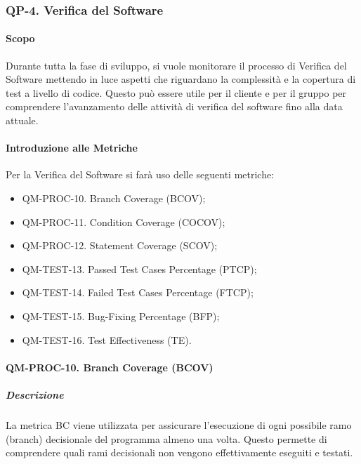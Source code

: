 		\subsubsection{QP-4. Verifica del Software}

			\paragraph{Scopo}

				Durante tutta la fase di sviluppo, si vuole monitorare il processo di Verifica del Software mettendo in luce aspetti che riguardano la complessità e la copertura di test a livello di codice. Questo può essere utile per il cliente e per il gruppo per comprendere l'avanzamento delle attività di verifica del software fino alla data attuale.

			\paragraph{Introduzione alle Metriche}

				Per la Verifica del Software si farà uso delle seguenti metriche:

				\begin{itemize}

					\item QM-PROC-10. Branch Coverage (BCOV);
					\item QM-PROC-11. Condition Coverage (COCOV);
					\item QM-PROC-12. Statement Coverage (SCOV);
					\item QM-TEST-13. Passed Test Cases Percentage (PTCP);
					\item QM-TEST-14. Failed Test Cases Percentage (FTCP);
					\item QM-TEST-15. Bug-Fixing Percentage (BFP);
					\item QM-TEST-16. Test Effectiveness (TE).
				\end{itemize}

			\paragraph{QM-PROC-10. Branch Coverage (BCOV)}

				\subparagraph{Descrizione}
				La metrica BC viene utilizzata per assicurare l'esecuzione di ogni possibile ramo (branch) decisionale del programma almeno una volta. Questo permette di comprendere quali rami decisionali non vengono effettivamente eseguiti e testati.

